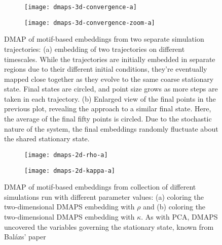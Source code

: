 \documentclass[epjST, final]{svjour}
\begin{document}
\begin{onehalfspace}
\begin{figure}[h!]
  \vspace{-5mm}
  \centering
  \begin{subfigure}{0.49\textwidth}
    \centering
    \texttt{[image: dmaps-3d-convergence-a]}
    \subcaption{\label{fig:dmaps-results-regular}}
  \end{subfigure} %
  \begin{subfigure}{0.49\textwidth}
    \centering
    \texttt{[image: dmaps-3d-convergence-zoom-a]}
    \subcaption{\label{fig:dmaps-results-zoom}}
  \end{subfigure}%
  \caption{DMAP of motif-based embeddings from two separate simulation
    trajectories: (a) embedding of two trajectories on different
    timescales. While the trajectories are initially embedded in
    separate regions due to their different initial conditions,
    they're eventually mapped close together as they evolve to the
    same coarse stationary state. Final states are circled, and point
    size grows as more steps are taken in each trajectory. (b)
    Enlarged view of the final points in the previous plot, revealing
    the approach to a similar final state. Here, the average of the
    final fifty points is circled. Due to the stochastic nature of
    the system, the final embeddings randomly fluctuate about the
    shared stationary state. \label{fig:dmaps-results}}
\end{figure}

\begin{figure}[h!]
  \vspace{-5mm}
  \centering
  \begin{subfigure}{0.49\textwidth}
    \centering
    \texttt{[image: dmaps-2d-rho-a]}
    \subcaption{\label{fig:dmaps-rho}}
  \end{subfigure} %
  \begin{subfigure}{0.49\textwidth}
    \centering
    \texttt{[image: dmaps-2d-kappa-a]}
    \subcaption{\label{fig:dmaps-kappa}}
  \end{subfigure}%
  \caption{DMAP of motif-based embeddings from collection of different
    simulations run with different parameter values: (a) coloring the
    two-dimensional DMAPS embedding with $\rho$ and (b) coloring the
    two-dimensional DMAPS embedding with $\kappa$. As with PCA, DMAPS
    uncovered the variables governing the stationary state, known from
    Bal\'{a}zs' paper \label{fig:dmaps-rk}}
\end{figure}



\end{onehalfspace}
\end{document}
